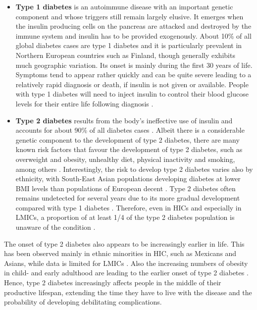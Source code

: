 \begin{itemize}
\item \textbf{Type 1 diabetes} is an autoimmune disease with an important genetic component and whose triggers still remain largely elusive. It emerges when the insulin producing cells on the pancreas are attacked and destroyed by the immune system and insulin has to be provided exogenously. About 10\% of all global diabetes cases are type 1 diabetes and it is particularly prevalent in Northern European countries such as Finland, though generally exhibits much geographic variation. Its onset is mainly during the first 30 years of life. Symptoms tend to appear rather quickly and can be quite severe leading to a relatively rapid diagnosis or death, if insulin is not given or available. People with type 1 diabetes will need to inject insulin to control their blood glucose levels for their entire life following diagnosis \parencite{Tuomilehto2013}. 
\item \textbf{Type 2 diabetes} results from the body's ineffective use of insulin and accounts for about 90\% of all diabetes cases \parencite{WorldHealthOrganization2016}. Albeit there is a considerable genetic component to the development of type 2 diabetes, there are many known risk factors that favour the development of type 2 diabetes, such as overweight and obesity, unhealthy diet, physical inactivity and smoking, among others \parencite{WorldHealthOrganization2016, AmericanDiabetesAssociation2014}. Interestingly, the risk to develop type 2 diabetes varies also by ethnicity, with South-East Asian populations developing diabetes at lower \ac{BMI} levels than populations of European decent \parencite{Ramachandran2010}. Type 2 diabetes often remains undetected for several years due to its more gradual development compared with type 1 diabetes \parencite{AmericanDiabetesAssociation2014}. Therefore, even in \acp{HIC} and especially in \acp{LMIC}, a proportion of at least 1/4 of the type 2 diabetes population is unaware of the condition \parencite{Beagley2014}. 
\end{itemize}

The onset of type 2 diabetes also appears to be increasingly earlier in life. This has been observed mainly in ethnic minorities in \acs{HIC}, such as Mexicans and Asians, while data is limited for \acp{LMIC} \parencite{FazeliFarsani2013}. Also the increasing numbers of obesity in child- and early adulthood are leading to the earlier onset of type 2 diabetes \parencite{Chen2012}. Hence, type 2 diabetes increasingly affects people in the middle of their productive lifespan, extending the time they have to live with the disease and the probability of developing debilitating complications.

